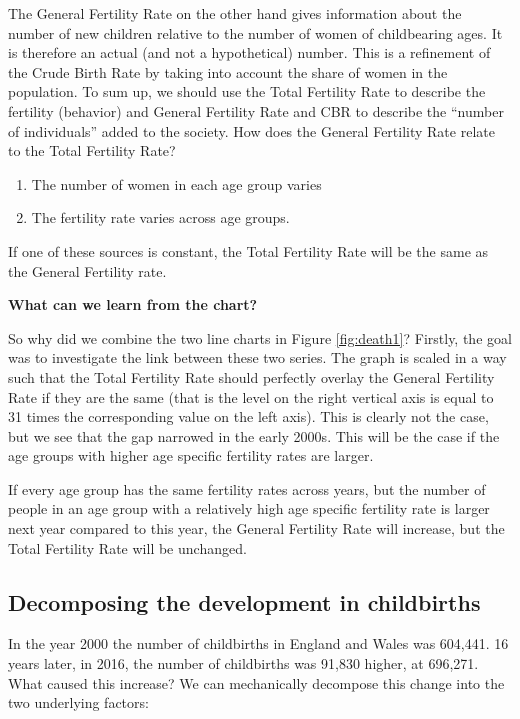 \documentclass[
]{book}
\providecommand{\tightlist}{%
  \setlength{\itemsep}{0pt}\setlength{\parskip}{0pt}}
\begin{document}
The General Fertility Rate on the other hand gives information about the number of new children relative to the number of women of childbearing ages. It is therefore an actual (and not a hypothetical) number. This is a refinement of the Crude Birth Rate by taking into account the share of women in the population. To sum up, we should use the Total Fertility Rate to describe the fertility (behavior) and General Fertility Rate and CBR to describe the ``number of individuals'' added to the society. How does the General Fertility Rate relate to the Total Fertility Rate?

\begin{enumerate}
\def\labelenumi{\arabic{enumi}.}
\tightlist
\item
  The number of women in each age group varies
\item
  The fertility rate varies across age groups.
\end{enumerate}

If one of these sources is constant, the Total Fertility Rate will be the same as the General Fertility rate.

\textbf{What can we learn from the chart?}

So why did we combine the two line charts in Figure \ref{fig:death1}? Firstly, the goal was to investigate the link between these two series. The graph is scaled in a way such that the Total Fertility Rate should perfectly overlay the General Fertility Rate if they are the same (that is the level on the right vertical axis is equal to 31 times the corresponding value on the left axis). This is clearly not the case, but we see that the gap narrowed in the early 2000s. This will be the case if the age groups with higher age specific fertility rates are larger.

If every age group has the same fertility rates across years, but the number of people in an age group with a relatively high age specific fertility rate is larger next year compared to this year, the General Fertility Rate will increase, but the Total Fertility Rate will be unchanged.

\hypertarget{decomposing-the-development-in-childbirths}{%
\subsection{Decomposing the development in childbirths}\label{decomposing-the-development-in-childbirths}}

In the year 2000 the number of childbirths in England and Wales was 604,441. 16 years later, in 2016, the number of childbirths was 91,830 higher, at 696,271. What caused this increase? We can mechanically decompose this change into the two underlying factors:
\end{document}
